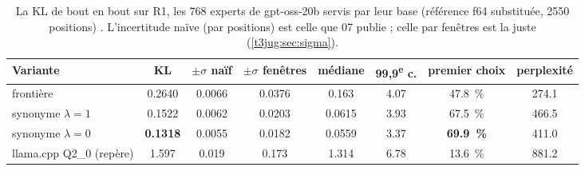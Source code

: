 \begin{table}[ht]
\centering\footnotesize
\caption[La KL de bout en bout, 768 experts substitués]{La KL de bout en bout sur R1, les 768 experts de gpt-oss-20b servis par leur base (référence f64 substituée, \num{2550} positions) \mes. L'incertitude naïve (par positions) est celle que 07 publie ; celle par fenêtres est la juste (\cref{t3jug:sec:sigma}).}
\label{t3sno:tab:kl}
\begin{tabular}{@{}lccccccc@{}}
\toprule
Variante & KL & $\pm\sigma$ naïf & $\pm\sigma$ fenêtres & médiane & 99,9\textsuperscript{e} c. & premier choix & perplexité \\
\midrule
frontière & \num{0.2640} & \num{0.0066} & \num{0.0376} & \num{0.163} & \num{4.07} & \SI{47.8}{\percent} & \num{274.1} \\
synonyme $\lambda = 1$ & \num{0.1522} & \num{0.0062} & \num{0.0203} & \num{0.0615} & \num{3.93} & \SI{67.5}{\percent} & \num{466.5} \\
synonyme $\lambda = 0$ & \textbf{\num{0.1318}} & \num{0.0055} & \num{0.0182} & \num{0.0559} & \num{3.37} & \textbf{\SI{69.9}{\percent}} & \num{411.0} \\
\midrule
llama.cpp Q2\_0 (repère) & \num{1.597} & \num{0.019} & \num{0.173} & \num{1.314} & \num{6.78} & \SI{13.6}{\percent} & \num{881.2} \\
\bottomrule
\end{tabular}
\end{table}

